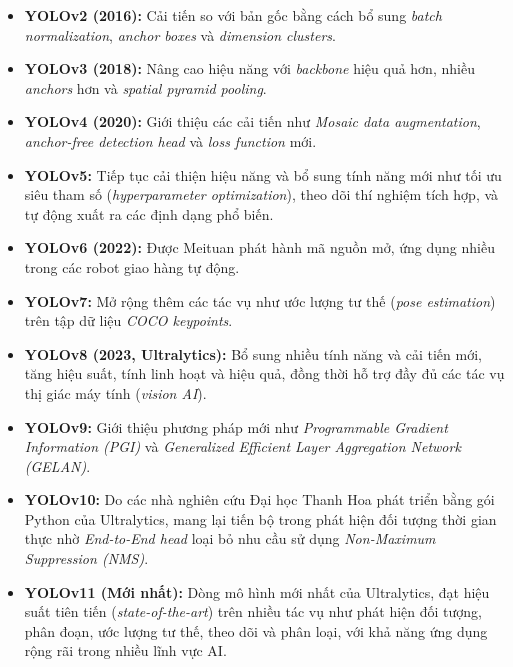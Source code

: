 \begin{itemize}
  \item \textbf{YOLOv2 (2016):} Cải tiến so với bản gốc bằng cách bổ sung \textit{batch normalization}, 
  \textit{anchor boxes} và \textit{dimension clusters}.
  
  \item \textbf{YOLOv3 (2018):} Nâng cao hiệu năng với \textit{backbone} hiệu quả hơn, nhiều \textit{anchors} 
  hơn và \textit{spatial pyramid pooling}.
  
  \item \textbf{YOLOv4 (2020):} Giới thiệu các cải tiến như \textit{Mosaic data augmentation}, 
  \textit{anchor-free detection head} và \textit{loss function} mới.
  
  \item \textbf{YOLOv5:} Tiếp tục cải thiện hiệu năng và bổ sung tính năng mới như tối ưu siêu tham số 
  (\textit{hyperparameter optimization}), theo dõi thí nghiệm tích hợp, và tự động xuất ra các định dạng phổ biến.
  
  \item \textbf{YOLOv6 (2022):} Được Meituan phát hành mã nguồn mở, ứng dụng nhiều trong các robot giao hàng tự động.
  
  \item \textbf{YOLOv7:} Mở rộng thêm các tác vụ như ước lượng tư thế (\textit{pose estimation}) trên tập dữ liệu 
  \textit{COCO keypoints}.
  
  \item \textbf{YOLOv8 (2023, Ultralytics):} Bổ sung nhiều tính năng và cải tiến mới, tăng hiệu suất, tính linh hoạt 
  và hiệu quả, đồng thời hỗ trợ đầy đủ các tác vụ thị giác máy tính (\textit{vision AI}).
  
  \item \textbf{YOLOv9:} Giới thiệu phương pháp mới như \textit{Programmable Gradient Information (PGI)} 
  và \textit{Generalized Efficient Layer Aggregation Network (GELAN)}.
  
  \item \textbf{YOLOv10:} Do các nhà nghiên cứu Đại học Thanh Hoa phát triển bằng gói Python của Ultralytics, 
  mang lại tiến bộ trong phát hiện đối tượng thời gian thực nhờ \textit{End-to-End head} loại bỏ nhu cầu sử dụng 
  \textit{Non-Maximum Suppression (NMS)}.
  
  \item \textbf{YOLOv11 (Mới nhất):} Dòng mô hình mới nhất của Ultralytics, đạt hiệu suất tiên tiến 
  (\textit{state-of-the-art}) trên nhiều tác vụ như phát hiện đối tượng, phân đoạn, ước lượng tư thế, 
  theo dõi và phân loại, với khả năng ứng dụng rộng rãi trong nhiều lĩnh vực AI.


\end{itemize}
